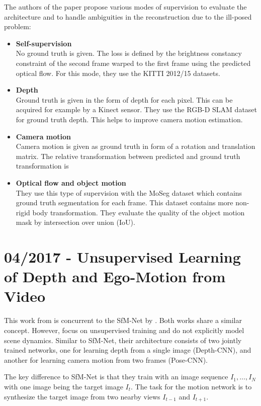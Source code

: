 		The authors of the paper propose various modes of supervision to evaluate the architecture and to handle ambiguities in the reconstruction due to the ill-posed problem:
		\begin{itemize}
		\item \textbf{Self-supervision}
			\\
			No ground truth is given.
			The loss is defined by the brightness constancy constraint of the second frame warped to the first frame using the predicted optical flow.
			For this mode, they use the {KITTI} 2012/15 datasets.
		\item \textbf{Depth}
			\\
			Ground truth is given in the form of depth for each pixel.
			This can be acquired for example by a Kinect sensor.
			They use the {RGB-D SLAM} dataset for ground truth depth.
			This helps to improve camera motion estimation. 
		\item \textbf{Camera motion}
			\\
			Camera motion is given as ground truth in form of a rotation and translation matrix.
			The relative transformation between predicted and ground truth transformation is 
		\item \textbf{Optical flow and object motion}
			\\
			They use this type of supervision with the MoSeg dataset which contains ground truth segmentation for each frame.
			This dataset contains more non-rigid body transformation.
			They evaluate the quality of the object motion mask by intersection over union (IoU).
		\end{itemize}
		
	\section{04/2017 - Unsupervised Learning of Depth and Ego-Motion from Video}
		
		This work from \cite{zhou2017unsupervised} is concurrent to the SfM-Net by \cite{SFMNET}.
		Both works share a similar concept.
		However, \cite{zhou2017unsupervised} focus on unsupervised training and do not explicitly model scene dynamics.
		Similar to SfM-Net, their architecture consists of two jointly trained networks, one for learning depth from a single image (Depth-CNN), and another for learning camera motion from two frames (Pose-CNN).
		
		The key difference to SfM-Net is that they train with an image sequence $I_1, \dots, I_N$ with one image being the target image $I_t$.
		The task for the motion network is to synthesize the target image from two nearby views $I_{t - 1}$ and $I_{t + 1}$.
		
